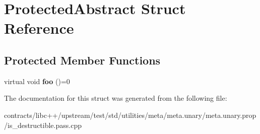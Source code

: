 \hypertarget{struct_protected_abstract}{}\section{Protected\+Abstract Struct Reference}
\label{struct_protected_abstract}
\subsection*{Protected Member Functions}
\begin{DoxyCompactItemize}
\item 
\mbox{\label{struct_protected_abstract_a59fb1681c708773703e31ee88e359b57}} 
virtual void {\bfseries foo} ()=0
\end{DoxyCompactItemize}


The documentation for this struct was generated from the following file\+:\begin{DoxyCompactItemize}
\item 
contracts/libc++/upstream/test/std/utilities/meta/meta.\+unary/meta.\+unary.\+prop/is\+\_\+destructible.\+pass.\+cpp\end{DoxyCompactItemize}
